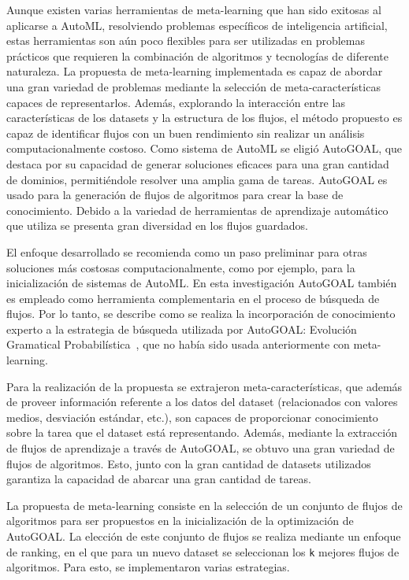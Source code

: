 \begin{conclusions}
Aunque existen varias herramientas de meta-learning que han sido exitosas al aplicarse a AutoML, resolviendo problemas específicos de inteligencia artificial, estas herramientas son aún poco flexibles para ser utilizadas en problemas prácticos que requieren la combinación de algoritmos y tecnologías de diferente naturaleza. La propuesta de meta-learning implementada es capaz de abordar una gran variedad de problemas mediante la selección de meta-características capaces de representarlos. Además, explorando la interacción entre las características de los datasets y la estructura de los flujos, el método propuesto es capaz de identificar flujos con un buen rendimiento sin realizar un análisis computacionalmente costoso. Como sistema de AutoML se eligió AutoGOAL, que destaca por su capacidad de generar soluciones eficaces para una gran cantidad de dominios, permitiéndole resolver una amplia gama de tareas. AutoGOAL es usado para la generación de flujos de algoritmos para crear la base de conocimiento. Debido a la variedad de herramientas de aprendizaje automático que utiliza se presenta gran diversidad en los flujos guardados.

El enfoque desarrollado se recomienda como un paso preliminar para otras soluciones más costosas computacionalmente, como por ejemplo, para la inicialización de sistemas de AutoML. En esta investigación AutoGOAL también es empleado como herramienta complementaria en el proceso de búsqueda de flujos. Por lo tanto, se describe como se realiza la incorporación de conocimiento experto a la estrategia de búsqueda utilizada por AutoGOAL: Evolución Gramatical Probabilística~\cite{pge2015}, que no había sido usada anteriormente con meta-learning.

Para la realización de la propuesta se extrajeron meta-características, que además de proveer información referente a los datos del dataset (relacionados con valores medios, desviación estándar, etc.), son capaces de proporcionar conocimiento sobre la tarea que el dataset está representando. Además, mediante la extracción de flujos de aprendizaje a través de AutoGOAL, se obtuvo una gran variedad de flujos de algoritmos. Esto, junto con la gran cantidad de datasets utilizados garantiza la capacidad de abarcar una gran cantidad de tareas.

La propuesta de meta-learning consiste en la selección de un conjunto de flujos de algoritmos para ser propuestos en la inicialización de la optimización de AutoGOAL. La elección de este conjunto de flujos se realiza mediante un enfoque de ranking, en el que para un nuevo dataset se seleccionan los \texttt{k} mejores flujos de algoritmos. Para esto, se implementaron varias estrategias.


\end{conclusions}
